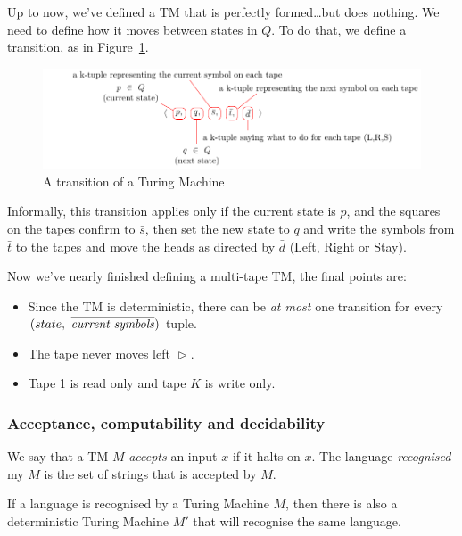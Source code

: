 Up to now, we've defined a TM that is perfectly formed\dots but does nothing. We
need to define how it moves between states in $Q$. To do that, we define a
transition, as in Figure~\ref{fig:tm-transition}.

\begin{figure}[H]
  \centering
  \includegraphics{equations/tm-transition}
  \caption{A transition of a Turing Machine}
  \label{fig:tm-transition}
\end{figure}

Informally, this transition applies only if the current state is $p$, and the
squares on the tapes confirm to $\bar{s}$, then set the new state to $q$ and
write the symbols from $\bar{t}$ to the tapes and move the heads as directed by
$\bar{d}$ (Left, Right or Stay).

Now we've nearly finished defining a multi-tape TM, the final points are:

\begin{itemize}
  \item Since the TM is deterministic, there can be \textit{at most} one 
    transition for every $(state,~\overline{\text{\textit{current symbols}}})$ 
    tuple.
  \item The tape never moves left $\vartriangleright$.
  \item Tape 1 is read only and tape $K$ is write only.
\end{itemize}

\subsubsection{Acceptance, computability and decidability}

We say that a TM $M$ \textit{accepts} an input $x$ if it halts on $x$. The
language \textit{recognised} my $M$ is the set of strings that is accepted by
$M$.


If a language is recognised by a Turing Machine $M$, then there is also a 
deterministic Turing Machine $M'$ that will recognise the same language. 

